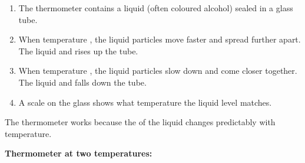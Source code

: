 \documentclass[11pt, a4paper]{article}
\newcommand{\blank}[1]{\underline{\hspace{#1}}}
\begin{document}
\begin{enumerate}
  \item The thermometer contains a liquid (often coloured alcohol) sealed in a glass tube.
  \item When temperature \blank{2.5cm}, the liquid particles move faster and spread further apart. The liquid \blank{2.5cm} and rises up the tube.
  \item When temperature \blank{2.5cm}, the liquid particles slow down and come closer together. The liquid \blank{2.5cm} and falls down the tube.
  \item A scale on the glass shows what temperature the liquid level matches.
\end{enumerate}

The thermometer works because the \blank{3cm} of the liquid changes predictably with temperature.

\medskip
\textbf{Thermometer at two temperatures:}
\end{document}
